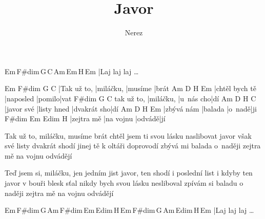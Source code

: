 \documentclass{song}
\author{Nerez}
\title{Javor}
\begin{document}
\strophe
Em\,F\#dim\,G\,C\,Am\,Em\,H\7\,Em
|Laj laj laj \ldots
\endstrophe

\strophe
Em          F\#dim    G       C
|Tak už to, |miláčku, |musíme |brát
Am             D\7       H\7    Em
|chtěl bych tě |naposled |pomilo|vat
           F\#dim    G         C
tak už to, |miláčku, |u~nás cho|dí
Am         D\7         H\7         C
|javor své |listy hned |dvakrát sho|dí
Am         D\7     H\7    Em
|zbývá nám |balada |o~nadě|ji
F\#dim     Em        Edim   H\7
|zejtra mě |na vojnu |odvádě|jí
\endstrophe

\strophe*
Tak už to, miláčku, musíme brát
chtěl jsem ti svou lásku naslibovat
javor však své listy dvakrát shodí
jinej tě k oltáři doprovodí
zbývá mi balada o~naději
zejtra mě na vojnu odvádějí
\endstrophe

\strophe*
Teď jsem si, miláčku, jen jedním jist
javor, ten shodí i poslední list
i kdyby ten javor v bouři blesk sťal
nikdy bych svou lásku nesliboval
zpívám si baladu o naději
zejtra mě na vojnu odvádějí
\endstrophe

\strophe
Em\,F\#dim\,G\,Am\,F\#dim\,Em\,Edim\,H\7\,Em\,F\#dim\,G\,Am\,Edim\,H\7\,Em
|Laj laj laj \ldots
\endstrophe
\end{document}
